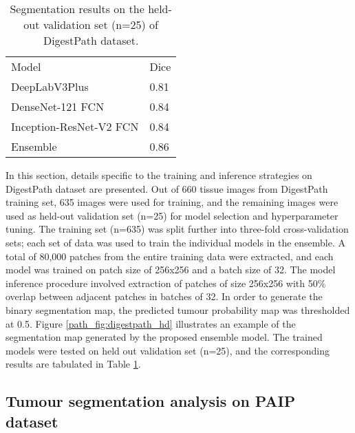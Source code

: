 \documentclass[times,twocolumn,final,authoryear]{tmp}
\begin{document}
\begin{table}
\centering
\caption{Segmentation results on the held-out validation set (n=25) of DigestPath dataset.}
\label{path_tab:digestpath_heldout_results}
\begin{tabular}{@{}ll@{}}
  
Model                 & Dice \\    
DeepLabV3Plus          & 0.81 \\
DenseNet-121 FCN       & 0.84 \\
Inception-ResNet-V2 FCN & 0.84 \\
Ensemble               & 0.86 \\  
\end{tabular}\end{table}
In this section, details specific to the training and inference strategies on DigestPath dataset are presented. Out of 660 tissue images from DigestPath training set, 635 images were used for training, and the remaining images were used as held-out validation set (n=25) for model selection and hyperparameter tuning. The training set (n=635) was split further into three-fold cross-validation sets; each set of data was used to train the individual models in the ensemble. A total of 80,000 patches from the entire training data were extracted, and each model was trained on patch size of 256x256 and a batch size of 32. The model inference procedure involved extraction of patches of size 256x256 with 50\% overlap between adjacent patches in batches of 32. In order to generate the binary segmentation map, the predicted tumour probability map was thresholded at 0.5. Figure \ref{path_fig:digestpath_hd} illustrates an example of the segmentation map generated by the proposed ensemble model. The trained models were tested on held out validation set (n=25), and the corresponding results are tabulated in Table \ref{path_tab:digestpath_heldout_results}.

\subsection{Tumour segmentation analysis on PAIP dataset}
\end{document}
